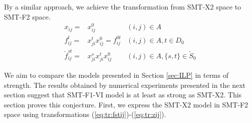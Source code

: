 By a similar approach, we achieve the transformation from SMT-X2 space to SMT-F2 space. 
\begin{subequations}
\begin{align}
\label{eq:tr:xij=xij0}x_{ij}=&x^0_{ij} & (i,j)\in A\\
\label{eq:tr:fijt2}f^t_{ij}=&x^t_{ji}x^0_{ij}=f^{0t}_{ij} & (i,j)\in A, t\in D_0\\
\label{eq:tr:fstij2}\check{f}^{st}_{ij}=& x^s_{ji}x^t_{ji}x^0_{ij} & (i,j)\in A, \{s,t\}\in \check{S}_0
\end{align}
\end{subequations}

We aim to compare the models presented in Section \ref{sec:ILP} in terms of strength. The results obtained by numerical experiments presented in the next section suggest that SMT-F1-VI model is at least as strong as SMT-X2. This section proves this conjecture. 
First, we express the SMT-X2 model in SMT-F2 space using transformations (\ref{eq:tr:fstij})-(\ref{eq:tr:zij}). 
